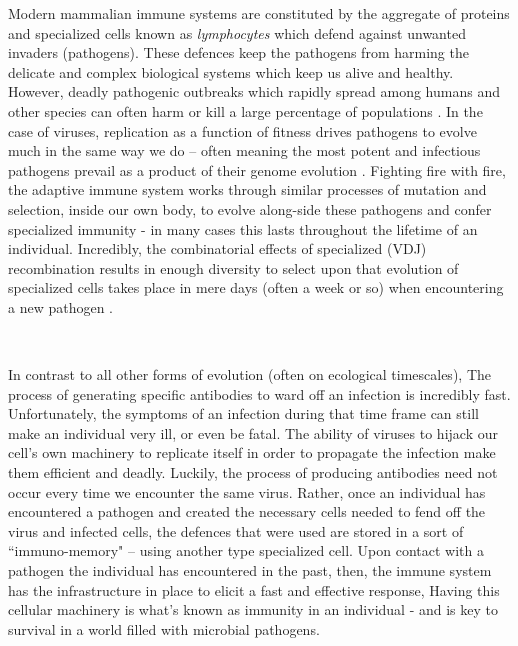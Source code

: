 \documentclass{article}
\begin{document}
Modern mammalian immune systems are constituted by the aggregate of proteins and specialized cells known as \textit{lymphocytes} which
defend against unwanted invaders (pathogens).
These defences keep the pathogens from harming the delicate and complex biological systems which keep us alive and healthy.
However, deadly pathogenic outbreaks which rapidly spread among humans and other species can often harm or kill a large percentage of populations \citep{Wu2020}.
In the case of viruses, replication as a function of fitness drives pathogens to evolve much in the same way we do --
often meaning the most potent and infectious pathogens prevail as a product of their genome evolution \citep{Twiddy2003, Felsenstein1981-zs}.
Fighting fire with fire, the adaptive immune system works through similar processes of mutation and selection, inside our own body,
to evolve along-side these pathogens and confer specialized immunity - in many cases this lasts throughout the lifetime of an individual.
Incredibly, the combinatorial effects of specialized (VDJ) recombination results in enough diversity to select upon that evolution of specialized cells
takes place in mere days (often a week or so) when encountering a new pathogen \citep{Jung2004}.

~

In contrast to all other forms of evolution (often on ecological timescales), 
The process of generating specific antibodies to ward off an infection is incredibly fast.
Unfortunately, the symptoms of an infection during that time frame can still make an individual very ill, or even be fatal.
The ability of viruses to hijack our cell's own machinery to replicate itself in order to propagate the infection make them efficient and deadly.
Luckily, the process of producing antibodies need not occur every time we encounter the same virus.
Rather, once an individual has encountered a pathogen and created the necessary cells needed to fend off the virus and infected cells,
the defences that were used are stored in a sort of ``immuno-memory" -- using another type specialized cell.
Upon contact with a pathogen the individual has encountered in the past, then,
the immune system has the infrastructure in place to elicit a fast and effective response, 
Having this cellular machinery is what's known as immunity in an individual - and is key to survival in a world filled with microbial pathogens.

~
\end{document}
